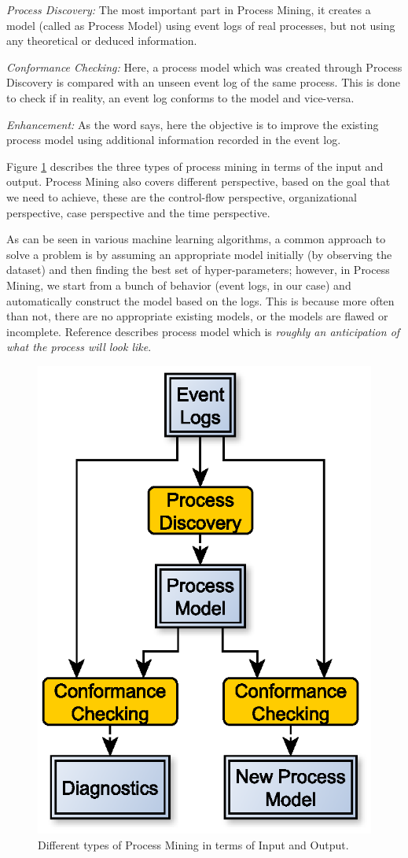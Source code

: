 \textit{Process Discovery:} The most important part in Process Mining, it creates a model (called as Process Model) using event logs of real processes, but not using any theoretical or deduced information. 

\textit{Conformance Checking:} Here, a process model which was created through Process Discovery is compared with an unseen event log of the same process. This is done to check if in reality, an event log conforms to the model and vice-versa.

\textit{Enhancement:} As the word says, here the objective is to improve the existing process model using additional information recorded in the event log.

Figure \ref{fig:ProcessMiningInputOutput} describes the three types of process mining in terms of the input and output. Process Mining also covers different perspective, based on the goal that we need to achieve, these are the control-flow perspective, organizational perspective, case perspective and the time perspective. 

As can be seen in various machine learning algorithms, a common approach to solve a problem is by assuming an appropriate model initially (by observing the dataset) and then finding the best set of hyper-parameters; however, in Process Mining, we start from a bunch of behavior (event logs, in our case) and automatically construct the model based on the logs. This is because more often than not, there are no appropriate existing models, or the models are flawed or incomplete. Reference\cite{Rolland1998} describes process model which is \textit{roughly an anticipation of what the process will look like}. 

\begin{figure}[h]
	\centering
	\includegraphics[width=0.6\columnwidth]{images/procesMiningInputOutput.eps}
	\caption{Different types of Process Mining in terms of Input and Output.}
	\label{fig:ProcessMiningInputOutput}
\end{figure}

